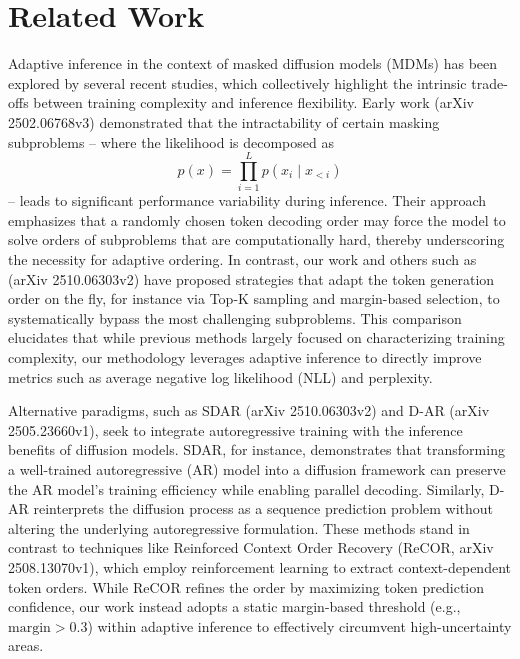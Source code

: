 \documentclass{article}
\begin{document}
\section{Related Work}
Adaptive inference in the context of masked diffusion models (MDMs) has been explored by several recent studies, which collectively highlight the intrinsic trade-offs between training complexity and inference flexibility. Early work (arXiv 2502.06768v3) demonstrated that the intractability of certain masking subproblems – where the likelihood is decomposed as 
\[
p(x)=\prod_{i=1}^{L}p(x_i\mid x_{<i})
\]
– leads to significant performance variability during inference. Their approach emphasizes that a randomly chosen token decoding order may force the model to solve orders of subproblems that are computationally hard, thereby underscoring the necessity for adaptive ordering. In contrast, our work and others such as (arXiv 2510.06303v2) have proposed strategies that adapt the token generation order on the fly, for instance via Top-K sampling and margin-based selection, to systematically bypass the most challenging subproblems. This comparison elucidates that while previous methods largely focused on characterizing training complexity, our methodology leverages adaptive inference to directly improve metrics such as average negative log likelihood (NLL) and perplexity.

Alternative paradigms, such as SDAR (arXiv 2510.06303v2) and D-AR (arXiv 2505.23660v1), seek to integrate autoregressive training with the inference benefits of diffusion models. SDAR, for instance, demonstrates that transforming a well-trained autoregressive (AR) model into a diffusion framework can preserve the AR model's training efficiency while enabling parallel decoding. Similarly, D-AR reinterprets the diffusion process as a sequence prediction problem without altering the underlying autoregressive formulation. These methods stand in contrast to techniques like Reinforced Context Order Recovery (ReCOR, arXiv 2508.13070v1), which employ reinforcement learning to extract context-dependent token orders. While ReCOR refines the order by maximizing token prediction confidence, our work instead adopts a static margin-based threshold (e.g., \(\text{margin} > 0.3\)) within adaptive inference to effectively circumvent high-uncertainty areas.
\end{document}
